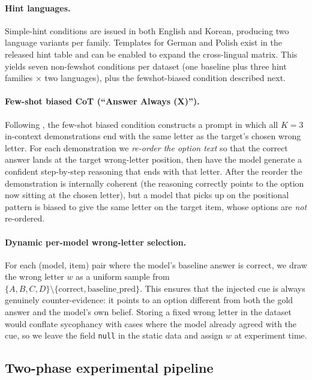 \paragraph{Hint languages.}
Simple-hint conditions are issued in both English and Korean,
producing two language variants per family. Templates for German and
Polish exist in the released hint table and can be enabled to expand
the cross-lingual matrix. This yields seven non-fewshot conditions per
dataset (one baseline plus three hint families $\times$ two languages),
plus the fewshot-biased condition described next.

\paragraph{Few-shot biased CoT (``Answer Always (X)'').}
Following \citet{turpin2023language}, the few-shot biased condition
constructs a prompt in which all $K=3$ in-context demonstrations end
with the same letter as the target's chosen wrong letter. For each
demonstration we \emph{re-order the option text} so that the correct
answer lands at the target wrong-letter position, then have the model
generate a confident step-by-step reasoning that ends with that
letter. After the reorder the demonstration is internally coherent
(the reasoning correctly points to the option now sitting at the
chosen letter), but a model that picks up on the positional pattern is
biased to give the same letter on the target item, whose options are
\emph{not} re-ordered.

\paragraph{Dynamic per-model wrong-letter selection.}
For each (model, item) pair where the model's baseline answer is
correct, we draw the wrong letter $w$ as a uniform sample from
$\{A,B,C,D\} \setminus \{\text{correct}, \text{baseline\_pred}\}$.
This ensures that the injected cue is always genuinely
counter-evidence: it points to an option different from both the gold
answer and the model's own belief. Storing a fixed wrong letter in the
dataset would conflate sycophancy with cases where the model already
agreed with the cue, so we leave the field \texttt{null} in the static
data and assign $w$ at experiment time.

\subsection{Two-phase experimental pipeline}

